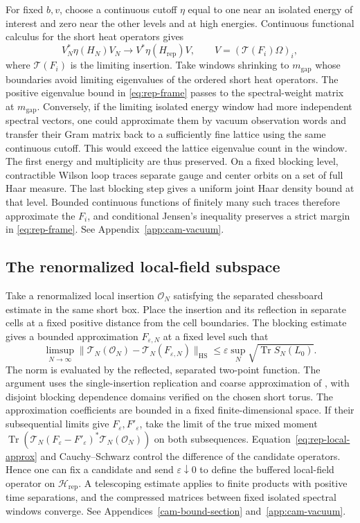 \documentclass[11pt,a4paper]{article}
\numberwithin{equation}{section}
\newcommand{\HS}{\mathrm{HS}}
\newcommand{\Tr}{\operatorname{Tr}}
\begin{document}
For fixed \(b,v\), choose a continuous cutoff \(\eta\) equal to one near an isolated energy of interest and zero near the other levels and at high energies. Continuous functional calculus for the short heat operators gives
\[
 V_N^*\eta(H_N)V_N\longrightarrow V^*\eta(H_{\mathrm{rep}})V,
 \qquad V=(\mathcal T(F_i)\Omega)_i ,
\]
where \(\mathcal T(F_i)\) is the limiting insertion. Take windows shrinking to \(m_{\mathrm{gap}}\) whose boundaries avoid limiting eigenvalues of the ordered short heat operators. The positive eigenvalue bound in \eqref{eq:rep-frame} passes to the spectral-weight matrix at \(m_{\mathrm{gap}}\). Conversely, if the limiting isolated energy window had more independent spectral vectors, one could approximate them by vacuum observation words and transfer their Gram matrix back to a sufficiently fine lattice using the same continuous cutoff. This would exceed the lattice eigenvalue count in the window. The first energy and multiplicity are thus preserved. On a fixed blocking level, contractible Wilson loop traces separate gauge and center orbits on a set of full Haar measure. The last blocking step gives a uniform joint Haar density bound at that level. Bounded continuous functions of finitely many such traces therefore approximate the \(F_i\), and conditional Jensen's inequality preserves a strict margin in \eqref{eq:rep-frame}. See Appendix~\ref{app:cam-vacuum}.

\subsection{The renormalized local-field subspace}

Take a renormalized local insertion \(\mathcal O_N\) satisfying the separated chessboard estimate in the same short box. Place the insertion and its reflection in separate cells at a fixed positive distance from the cell boundaries. The blocking estimate gives a bounded approximation \(F_{\varepsilon,N}\) at a fixed level such that
\begin{equation}\label{eq:rep-local-approx}
 \limsup_{N\to\infty}
       \|\mathcal T_N(\mathcal O_N)-\mathcal T_N(F_{\varepsilon,N})\|_{\HS}
     \leq \varepsilon\sup_N\sqrt{\Tr S_N(L_0)} .
\end{equation}
The norm is evaluated by the reflected, separated two-point function. The argument uses the single-insertion replication and coarse approximation of \cite[Lemmas 14.14 and 14.29]{armstrong}, with disjoint blocking dependence domains verified on the chosen short torus. The approximation coefficients are bounded in a fixed finite-dimensional space. If their subsequential limits give \(F_\varepsilon,F'_\varepsilon\), take the limit of the true mixed moment
\(\Tr(\mathcal T_N(F_\varepsilon-F'_\varepsilon)^*\mathcal T_N(\mathcal O_N))\)
on both subsequences. Equation~\eqref{eq:rep-local-approx} and Cauchy--Schwarz control the difference of the candidate operators. Hence one can fix a candidate and send \(\varepsilon\downarrow0\) to define the buffered local-field operator on \(\mathcal H_{\mathrm{rep}}\). A telescoping estimate applies to finite products with positive time separations, and the compressed matrices between fixed isolated spectral windows converge. See Appendices~\ref{cam-bound-section} and~\ref{app:cam-vacuum}.
\end{document}
